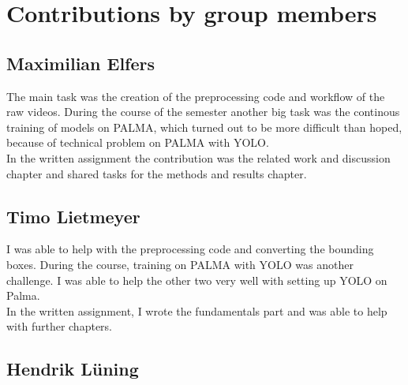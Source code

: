 \chapter{Contributions by group members}
\label{ch:contributions}


\section{Maximilian Elfers}

The main task was the creation of the preprocessing code and workflow of the raw videos. During the course of the semester another big task was the continous training of models on PALMA, which turned out to be more difficult than hoped, because of technical problem on PALMA with YOLO. \\
In the written assignment the contribution was the related work and discussion chapter and shared tasks for the methods and results chapter.

\section{Timo Lietmeyer}
I was able to help with the preprocessing code and converting the bounding boxes. During the course, training on PALMA with YOLO was another challenge. I was able to help the other two very well with setting up YOLO on Palma. \\ In the written assignment, I wrote the fundamentals part and was able to help with further chapters.

\section{Hendrik Lüning}
